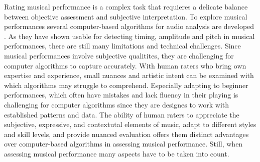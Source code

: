 Rating musical performance is a complex task that requieres a delicate balance between objective assessment and subjective interpretation. To explore musical performances several computer-based algorithms for audio analysis are developed \cite{Goebl2014}. As they have shown usable for detecting timing, amplitude and pitch in musical performances, there are still many limitations and technical challenges. Since musical performances involve subjective qualitites, they are challenging for computer algorithms to capture accurately. With human raters who bring own expertise and experience, small nuances and artistic intent can be examined with which algorithms may struggle to comprehend. Especially adapting to beginner performances, which often have mistakes and lack fluency in their playing is challenging for computer algorithms since they are designes to work with established patterns and data. The ability of human raters to appreciate the subjective, expressive, and contextutal elements of music, adapt to different styles and skill levels, and provide nuanced evaluation offers them distinct advantages over computer-based algorithms in assessing musical performance. Still, when assessing musical performance many aspects have to be taken into count. 

